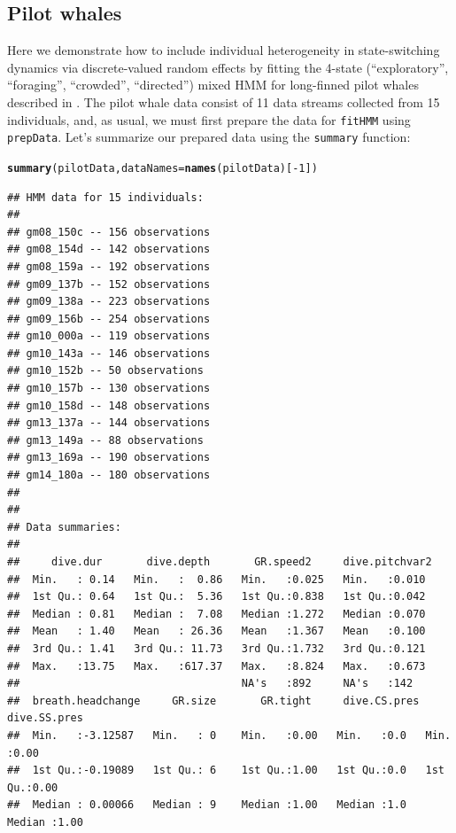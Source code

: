 \documentclass[12pt]{article}\usepackage[]{graphicx}\usepackage[]{xcolor}
\makeatletter
\newcommand{\hlnum}[1]{\textcolor[rgb]{0.686,0.059,0.569}{#1}}%
\newcommand{\hlopt}[1]{\textcolor[rgb]{0,0,0}{#1}}%
\newcommand{\hldef}[1]{\textcolor[rgb]{0.345,0.345,0.345}{#1}}%
\newcommand{\hlkwc}[1]{\textcolor[rgb]{0.333,0.667,0.333}{#1}}%
\newcommand{\hlkwd}[1]{\textcolor[rgb]{0.737,0.353,0.396}{\textbf{#1}}}%
\newenvironment{kframe}{%
 \def\at@end@of@kframe{}%
 \ifinner\ifhmode%
  \def\at@end@of@kframe{\end{minipage}}%
  \begin{minipage}{\columnwidth}%
 \fi\fi%
 \def\FrameCommand##1{\hskip\@totalleftmargin \hskip-\fboxsep
 \colorbox{shadecolor}{##1}\hskip-\fboxsep
     \hskip-\linewidth \hskip-\@totalleftmargin \hskip\columnwidth}%
 \MakeFramed {\advance\hsize-\width
   \@totalleftmargin\z@ \linewidth\hsize
   \@setminipage}}%
 {\par\unskip\endMakeFramed%
 \at@end@of@kframe}
\newenvironment{knitrout}{}{} %
\makeatother
\begin{document}
\subsection{Pilot whales}
\label{sec:pilotWhale}

Here we demonstrate how to include individual heterogeneity in state-switching dynamics via discrete-valued random effects by fitting the 4-state (``exploratory'', ``foraging'', ``crowded'', ``directed'') mixed HMM for long-finned pilot whales described in \cite{IsojunnoEtAl2017}.  The pilot whale data consist of 11 data streams collected from 15 individuals, and, as usual, we must first prepare the data for \verb|fitHMM| using \verb|prepData|. Let's summarize our prepared data using the \verb|summary| function:
\begin{knitrout}
\color{fgcolor}\begin{kframe}
\begin{alltt}
\hlkwd{summary}\hldef{(pilotData,} \hlkwc{dataNames}\hldef{=}\hlkwd{names}\hldef{(pilotData)[}\hlopt{-}\hlnum{1}\hldef{])}
\end{alltt}
\begin{verbatim}
## HMM data for 15 individuals:
## 
## gm08_150c -- 156 observations
## gm08_154d -- 142 observations
## gm08_159a -- 192 observations
## gm09_137b -- 152 observations
## gm09_138a -- 223 observations
## gm09_156b -- 254 observations
## gm10_000a -- 119 observations
## gm10_143a -- 146 observations
## gm10_152b -- 50 observations
## gm10_157b -- 130 observations
## gm10_158d -- 148 observations
## gm13_137a -- 144 observations
## gm13_149a -- 88 observations
## gm13_169a -- 190 observations
## gm14_180a -- 180 observations
## 
## 
## Data summaries:
## 
##     dive.dur       dive.depth       GR.speed2     dive.pitchvar2 
##  Min.   : 0.14   Min.   :  0.86   Min.   :0.025   Min.   :0.010  
##  1st Qu.: 0.64   1st Qu.:  5.36   1st Qu.:0.838   1st Qu.:0.042  
##  Median : 0.81   Median :  7.08   Median :1.272   Median :0.070  
##  Mean   : 1.40   Mean   : 26.36   Mean   :1.367   Mean   :0.100  
##  3rd Qu.: 1.41   3rd Qu.: 11.73   3rd Qu.:1.732   3rd Qu.:0.121  
##  Max.   :13.75   Max.   :617.37   Max.   :8.824   Max.   :0.673  
##                                   NA's   :892     NA's   :142    
##  breath.headchange     GR.size       GR.tight     dive.CS.pres  dive.SS.pres 
##  Min.   :-3.12587   Min.   : 0    Min.   :0.00   Min.   :0.0   Min.   :0.00  
##  1st Qu.:-0.19089   1st Qu.: 6    1st Qu.:1.00   1st Qu.:0.0   1st Qu.:0.00  
##  Median : 0.00066   Median : 9    Median :1.00   Median :1.0   Median :1.00  

\end{verbatim}
\end{kframe}
\end{knitrout}
\end{document}
